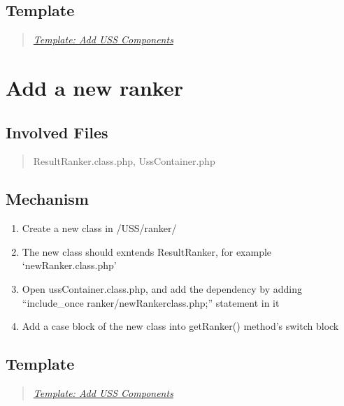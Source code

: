 \documentclass[letterpaper,10pt,english]{sphinxmanual}
\begin{document}
\subsection{Template}
\label{docs/hooks/new_selector:template}\begin{quote}

{\hyperref[docs/hooks/t_uss_components:hook-template-uss]{\emph{Template: Add USS Components}}}
\end{quote}


\section{Add a new ranker}
\label{docs/hooks/new_ranker:add-a-new-ranker}\label{docs/hooks/new_ranker::doc}\label{docs/hooks/new_ranker:hook-ranker}

\subsection{Involved Files}
\label{docs/hooks/new_ranker:involved-files}\begin{quote}

ResultRanker.class.php, UssContainer.php
\end{quote}


\subsection{Mechanism}
\label{docs/hooks/new_ranker:mechanism}\begin{enumerate}
\item {} 
Create a new class in /USS/ranker/

\item {} 
The new class should exntends ResultRanker, for example `newRanker.class.php'

\item {} 
Open ussContainer.class.php, and add the dependency by adding ``include\_once ranker/newRankerclass.php;'' statement in it

\item {} 
Add a case block of the new class into getRanker() method's switch block

\end{enumerate}


\subsection{Template}
\label{docs/hooks/new_ranker:template}\begin{quote}

{\hyperref[docs/hooks/t_uss_components:hook-template-uss]{\emph{Template: Add USS Components}}}
\end{quote}
\end{document}
